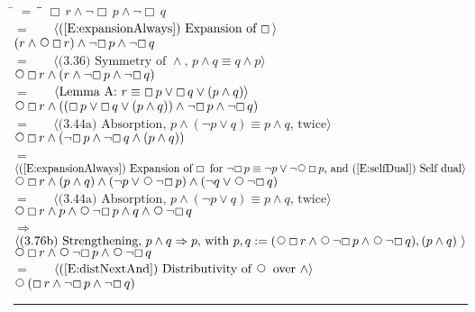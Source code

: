 \documentclass[12pt, fleqn, leqno]{article}
\newcommand{\lgap}{2pt}                             %
\newcommand{\mymathindent}{24pt}                    %
\newcommand{\impl}{\ensuremath{\Rightarrow}}        %
\newcommand{\Next}{\;\,\text{\raisebox{3.5pt}{\circle{6}}}}
\newcommand{\Always}{\Box\,}
\newcommand{\myqed}{\rule[-.23ex]{1.2ex}{2.0ex}}
\newcommand{\myqedtab}{\hspace{384pt}}              %
\newcommand{\Gll} {\langle}                         %
\newcommand{\Ggg} {\rangle}                         %
\newcommand{\Hint}[1]     {\ \ \ $\Gll              \mbox{#1} \Ggg$ }   %
\begin{document}
\begin{tabbing}
\hspace{\mymathindent} \= $= \;$ \= \myqedtab \= \kill
  \> \>   $\Always r \land \neg \Always p \land \neg \Always q$\\[\lgap]
  \> $=$  \>  \Hint{(\ref{E:expansionAlways}) Expansion of $\Always$}\\[\lgap]
  \> \>   $(r \land \Next \Always r) \land \neg \Always p \land \neg \Always q$\\[\lgap]
  \> $=$ \> \Hint{(3.36) Symmetry of $\land$, $p\land q \equiv q\land p$} \\[\lgap]
  \> \>   $ \Next \Always r \land ( r \land \neg \Always p \land \neg \Always q)$\\[\lgap]
   \> $=$  \>  \Hint{Lemma A: $ r \equiv \Always p \lor \Always q \lor ( p \land q)$}\\[\lgap]
   \> \>   $ \Next \Always r \land ( ( \Always p \lor \Always q \lor ( p \land q)) \land \neg \Always p \land \neg \Always q)$\\[\lgap]
   \> $=$ \> \Hint{(3.44a) Absorption, $p\land (\neg p\lor q)\equiv p\land q$, twice} \\[\lgap]
   \> \>   $ \Next \Always r \land ( \neg \Always p \land \neg \Always q \land (p \land q))$\\[\lgap]
   \> $=$  \>  \Hint{(\ref{E:expansionAlways}) Expansion of $\Always$ for $\neg \Always p \equiv \neg p \lor \neg \Next \Always p$, and (\ref{E:selfDual}) Self dual}\\[\lgap]
   \> \>   $ \Next \Always r \land (p \land q) \land ( \neg p \lor \Next \neg \Always p) \land ( \neg q \lor \Next \neg \Always q)$\\[\lgap]
   \> $=$ \> \Hint{(3.44a) Absorption, $p\land (\neg p\lor q)\equiv p\land q$, twice} \\[\lgap]
   \> \>   $ \Next \Always r \land p \land  \Next \neg \Always p \land q \land \Next \neg \Always q$\\[\lgap]
    \> $\impl$  \>  \Hint{(3.76b) Strengthening, $p\land q \impl p$, with $p,q := ( \Next \Always r  \land  \Next \neg \Always p \land \Next \neg \Always q), (p \land q)$ }\\[\lgap]
     \> \>   $ \Next \Always r  \land  \Next \neg \Always p \land \Next \neg \Always q$\\[\lgap]
      \> $=$  \>  \Hint{(\ref{E:distNextAnd}) Distributivity of $\Next$ over $\land$}\\[\lgap]
       \> \>   $ \Next (\Always r  \land \neg \Always p \land \neg \Always q)$ \quad \myqed
\end{tabbing}
\end{document}
